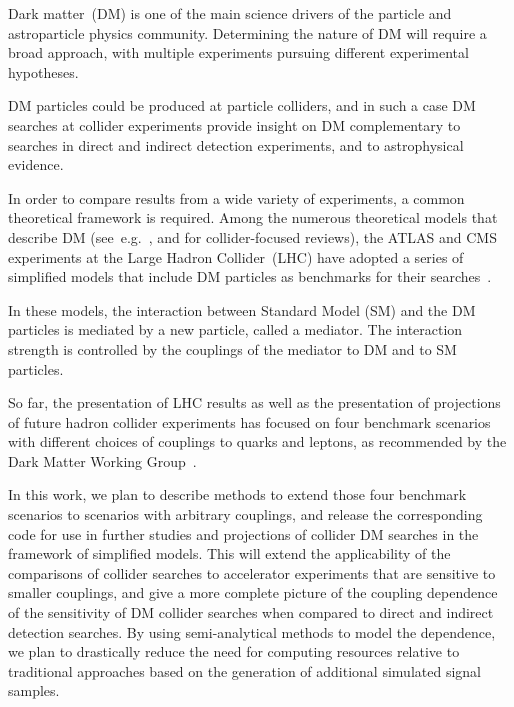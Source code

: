 \documentclass[a4paper,11pt,notoc]{article}
\begin{document}
\author[13]{Lian-Tao~Wang}




\renewcommand\contentsname{} %

\notoc 

\maketitle


\vskip20pt


Dark matter~(DM) is one of the main science drivers of the particle and astroparticle physics community.  
Determining the nature of DM will require a broad approach, with multiple experiments pursuing different experimental hypotheses.

DM particles could be produced at particle colliders, and in such a case DM searches at collider experiments provide insight on DM complementary to searches in direct and indirect detection experiments, and to astrophysical evidence.

In order to compare results from a wide variety of experiments, a common theoretical framework is required. Among the numerous theoretical models that describe DM  (see~e.g.~\cite{doi:10.1146/annurev-astro-082708-101659}, and \cite{Kahlhoefer:2017dnp,doi:10.1146/annurev-nucl-101917-021008} for collider-focused reviews), the ATLAS and CMS experiments at the Large Hadron Collider~(LHC) have adopted a series of simplified models that include DM  particles as benchmarks for their searches~\cite{ABERCROMBIE2020100371}.

In these models, the interaction between Standard Model (SM) and the DM particles is mediated by a new particle, called a mediator. The interaction strength is controlled by the couplings of the mediator to DM and to SM particles. 

So far, the presentation of LHC results as well as the presentation of projections of future hadron collider experiments has focused on four benchmark scenarios with different choices of couplings to quarks and leptons, as recommended by the Dark Matter Working Group~\cite{BOVEIA2020100365, ALBERT2019100377}.

In this work, we plan to describe methods to extend those four benchmark scenarios to scenarios with arbitrary couplings, and release the corresponding code for use in further studies and projections of collider DM searches in the framework of simplified models. This will extend the applicability of the comparisons of collider searches to accelerator experiments that are sensitive to smaller couplings, and give a more complete picture of the coupling dependence of the sensitivity of DM collider searches when compared to direct and indirect detection searches. By using semi-analytical methods to model the dependence, we plan to drastically reduce the need for computing resources relative to traditional approaches based on the generation of additional simulated signal samples.
\end{document}
